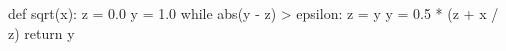 \begin{pylisting}{}
def sqrt(x):
    z = 0.0
    y = 1.0
    while abs(y - z) > epsilon:
        z = y
        y = 0.5 * (z + x / z)
    return y
\end{pylisting}


